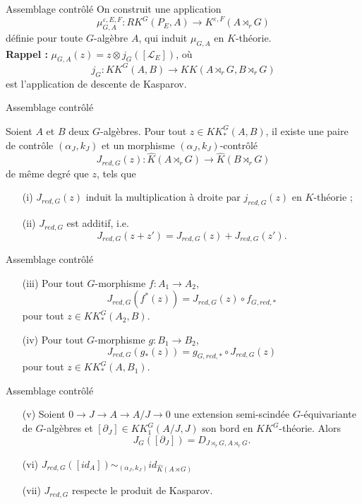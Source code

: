\begin{frame}{Assemblage contrôlé}
On construit une application 
\[\mu_{G,A}^{\varepsilon, E,F} : RK^G(P_E,A) \rightarrow K^{\varepsilon, F}(A \rtimes_r G)\]
définie pour toute $G$-algèbre $A$, qui induit $\mu_{G,A}$ en $K$-théorie. \\ %
\vspace{0.3 cm}
\textbf{Rappel :} $\mu_{G,A}(z) = z\otimes j_G([\mathcal L_E])$, où
\[j_G : KK^G(A,B)\rightarrow KK(A\rtimes_r G, B\rtimes_r G)\]
est l'application de descente de Kasparov.
\end{frame}

\begin{frame}{Assemblage contrôlé}
\begin{propfr}
Soient $A$ et $B$ deux $G$-algèbres. Pour tout $z\in KK^G_*(A,B)$, il existe une paire de contrôle $(\alpha_J,k_J)$ et un morphisme $(\alpha_J,k_J)$-contrôlé
\[J_{red,G}(z) : \hat K(A\rtimes_r G)\rightarrow \hat K(B\rtimes_r G)\]
de même degré que $z$, tels que
\begin{enumerate}
\item[(i)] $J_{red,G}(z)$ induit la multiplication à droite par $j_{red,G}(z)$ en $K$-théorie ;
\item[(ii)] $J_{red,G}$ est additif, i.e.
\[J_{red,G}(z+z')=J_{red,G}(z)+J_{red,G}(z').\]
\end{enumerate}
\end{propfr}
\end{frame}

\begin{frame}{Assemblage contrôlé}
\begin{propfr}[suite]
\begin{enumerate}
\item[(iii)] Pour tout $G$-morphisme $f : A_1\rightarrow A_2$,
\[J_{red,G}(f^*(z))=J_{red,G}(z)\circ f_{G,red,*}\] pour tout $z\in KK_*^G(A_2,B)$.
\item[(iv)] Pour tout $G$-morphisme $g : B_1\rightarrow B_2$,
\[J_{red,G}(g_*(z))= g_{G,red,*}\circ J_{red,G}(z)\] pour tout $z\in KK_*^G(A,B_1)$.
\end{enumerate}
\end{propfr}
\end{frame}

\begin{frame}{Assemblage contrôlé}
\begin{propfr}[suite]
\begin{enumerate}
\item[(v)] Soient $0\rightarrow J\rightarrow A\rightarrow A/J\rightarrow 0$ une extension semi-scindée $G$-équivariante de $G$-algèbres et  $[\partial_J]\in KK_1^G(A/J,J)$ son bord en $KK^G$-théorie. Alors 
\[J_G([\partial_J])=D_{J\rtimes_r G,A\rtimes_rG}.\] 
\item[(vi)] $J_{red,G}([id_A]) \sim_{(\alpha_J,k_J)} id_{\hat K(A\rtimes G)}$
\vspace{0.3 cm}
\item[(vii)] $J_{red,G}$ respecte le produit de Kasparov.
\end{enumerate}
\end{propfr}
\end{frame}

